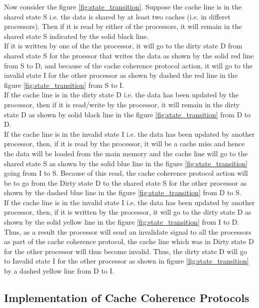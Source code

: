 \documentclass[12pt]{article}
\begin{document}
Now consider the figure \ref{fig:state_transition}. Suppose the cache line is in the shared state S i.e. the data is shared by at least two caches (i.e. in differet processors).
Then if it is read by either of the processors, it will remain in the shared state S indicated by the solid black line. \\
If it is written by one of the the processor, it will go to the dirty state D from shared 
state S for the proessor that writes the data as shown by the solid red line from S to D, and because of the cache coherence protocol action, it will go to the invalid state I for the other processor as shown by dashed the red line in the
figure \ref{fig:state_transition} from S to I. \\
If the cache line is in the dirty state D i.e. the data has been updated by the processor, then if it is read/write by the processor, it will remain in the dirty state D as shown by solid black line in the figure \ref{fig:state_transition} from D to D.\\
If the cache line is in the invalid state I i.e. the data has been updated by another processor, then, if it is read by the processor, it will 
be a cache miss and hence the data will be loaded from the main memory and the cache line will go to the shared state S as shown by the solid blue line in the figure \ref{fig:state_transition} going from I to S.
Because of this read, the cache coherence protocol action will be to go from the Dirty state D to the shared state S for the other processor as shown by the dashed blue line in the figure \ref{fig:state_transition} from D to S.\\
If the cache line is in the invalid state I i.e. the data has been updated by another processor, then, if it is written by the processor, it will go to the dirty state D as shown by the solid yellow line in the figure \ref{fig:state_transition} from I to D.
Thus, as a result the processor will send an invalidate signal to all the processors as part of the cache coherence protocol, the cache line which was in Dirty state D for the other processor
will thus become invalid. Thus, the dirty state D will go to Invalid state I for the other processor as shown in figure \ref{fig:state_transition} by a dashed yellow line from D to I. \\
\subsection{Implementation of Cache Coherence Protocols}
\end{document}
